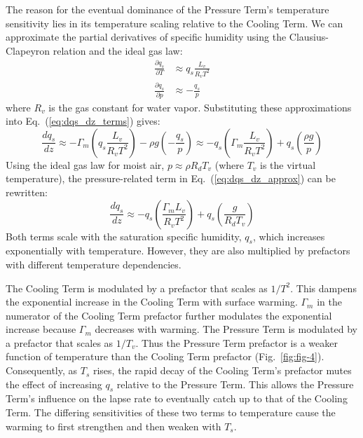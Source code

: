 \documentclass{ametsocV6.1}
\begin{document}
The reason for the eventual dominance of the Pressure Term's temperature sensitivity lies in its temperature scaling relative to the Cooling Term. We can approximate the partial derivatives of specific humidity using the Clausius-Clapeyron relation and the ideal gas law:
\begin{align}
\frac{\partial q_s}{\partial T}&\approx q_s\frac{L_v}{R_v T^2} \label{eq:dqs_dt_approx} \\
\frac{\partial q_s}{\partial p}&\approx -\frac{q_s}{p} \label{eq:dqs_dp_approx}
\end{align}
where $R_v$ is the gas constant for water vapor. Substituting these approximations into Eq.~(\ref{eq:dqs_dz_terms}) gives:
\begin{equation}
\frac{dq_s}{dz} \approx-\Gamma_m\left(q_s\frac{L_v}{R_v T^2}\right)-\rho g\left(-\frac{q_s}{p}\right) \approx -q_s\left(\Gamma_m\frac{L_v}{R_v T^2}\right)+q_s\left(\frac{\rho g}{p}\right) \label{eq:dqs_dz_approx}
\end{equation}
Using the ideal gas law for moist air, $p\approx\rho R_d T_v$ (where $T_v$ is the virtual temperature), the pressure-related term in Eq.~(\ref{eq:dqs_dz_approx}) can be rewritten:
\begin{equation}
\frac{dq_s}{dz} \approx -q_s \left(\frac{\Gamma_m L_v}{R_v T^2}\right) + q_s \left(\frac{g}{R_d T_v}\right) \label{eq:dqs_dz_prefactors}
\end{equation}
Both terms scale with the saturation specific humidity, $q_s$, which increases exponentially with temperature. However, they are also multiplied by prefactors with different temperature dependencies.

The Cooling Term is modulated by a prefactor that scales as $1/T^2$. This dampens the exponential increase in the Cooling Term with surface warming. $\Gamma_m$ in the numerator of the Cooling Term prefactor further modulates the exponential increase because $\Gamma_m$ decreases with warming. The Pressure Term is modulated by a prefactor that scales as $1/T_v$. Thus the Pressure Term prefactor is a weaker function of temperature than the Cooling Term prefactor (Fig.~\ref{fig:fig-4}). Consequently, as $T_s$ rises, the rapid decay of the Cooling Term's prefactor mutes the effect of increasing $q_s$ relative to the Pressure Term. This allows the Pressure Term's influence on the lapse rate to eventually catch up to that of the Cooling Term. The differing sensitivities of these two terms to temperature cause the warming to first strengthen and then weaken with $T_s$.
\end{document}
